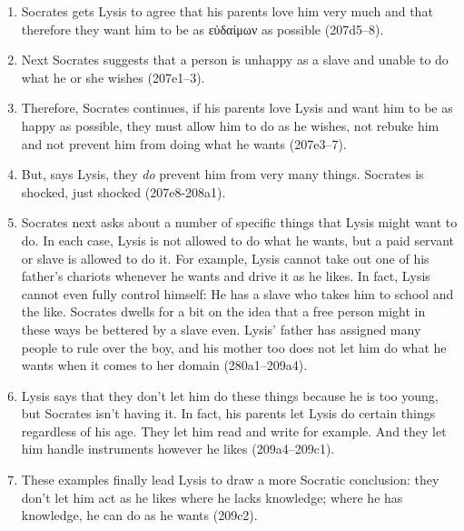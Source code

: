\documentclass[11pt]{article}
\begin{document}
\begin{enumerate}

    \item Socrates gets Lysis to agree that his parents love him very much
        and that therefore they want him to be as {\g εὐδαίμων} as possible
        (207d5--8).

    \item Next Socrates suggests that a person is unhappy as a slave and
        unable to do what he or she wishes (207e1--3).

    \item Therefore, Socrates continues, if his parents love Lysis and want
        him to be as happy as possible, they must allow him to do as he
        wishes, not rebuke him and not prevent him from doing what he wants
        (207e3--7).

    \item But, says Lysis, they \emph{do} prevent him from very many
        things.  Socrates is shocked, just shocked (207e8-208a1).

    \item Socrates next asks about a number of specific things that Lysis
        might want to do.  In each case, Lysis is not allowed to do what he
        wants, but a paid servant or slave is allowed to do it.  For
        example, Lysis cannot take out one of his father's chariots
        whenever he wants and drive it as he likes.  In fact, Lysis cannot
        even fully control himself: He has a slave who takes him to school
        and the like.  Socrates dwells for a bit on the idea that a free
        person might in these ways be bettered by a slave even.  Lysis'
        father has assigned many people to rule over the boy, and his
        mother too does not let him do what he wants when it comes to her
        domain (280a1--209a4).

    \item Lysis says that they don't let him do these things because he is
        too young, but Socrates isn't having it.  In fact, his parents let
        Lysis do certain things regardless of his age.  They let him read
        and write for example.  And they let him handle instruments however
        he likes (209a4--209c1).

    \item These examples finally lead Lysis to draw a more Socratic
        conclusion: they don't let him act as he likes where he lacks
        knowledge; where he has knowledge, he can do as he wants (209c2).


\end{enumerate}
\end{document}
